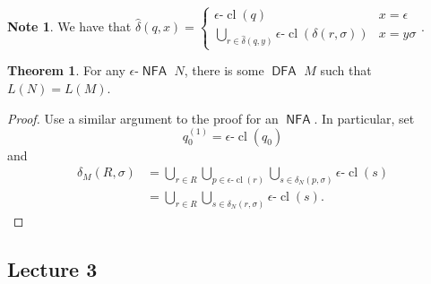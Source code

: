 \documentclass[10pt,letterpaper,cm]{nupset}
\theoremstyle{definition}
\newtheorem{note}{Note}
\newtheorem{theorem}{Theorem}
\newcommand{\1}{\mathbf{1}}
\newcommand{\0}{\vec 0}
\DeclareMathOperator{\cl}{cl}
\DeclareMathOperator{\DFA}{\mathsf{DFA}}
\DeclareMathOperator{\NFA}{\mathsf{NFA}}
\begin{document}
\begin{note}
We have that $\hat{\delta}(q, x) = \begin{cases} \epsilon \text{-}\cl(q) & x = \epsilon
\\ \bigcup_{r\in \hat{\delta}(q, y)} \epsilon \text{-}\cl(\delta(r, \sigma)) & x = y\sigma 
\end{cases}.$
\end{note}

\begin{theorem}
For any $\epsilon$-$\NFA$ $N$, there is some $\DFA$ $M$ such that $L(N) = L(M)$.
\end{theorem}
\begin{proof}
Use a similar argument to the proof for an $\NFA$. In particular, set $$q_0^{(1)} = \epsilon \text{-}\cl(q_0)$$ and 
\begin{align*}
\delta_M(R, \sigma)  & =  \bigcup_{r\in R}\bigcup_{p\in \epsilon \text{-}\cl(r)} \bigcup_{s\in \delta_N(p, \sigma)} \epsilon \text{-}\cl(s)
\\ & = \bigcup_{r\in R} \bigcup_{s\in \delta_N(r, \sigma)} \epsilon \text{-}\cl(s)
.\end{align*}
\end{proof}

\subsection{Lecture 3}
\end{document}
